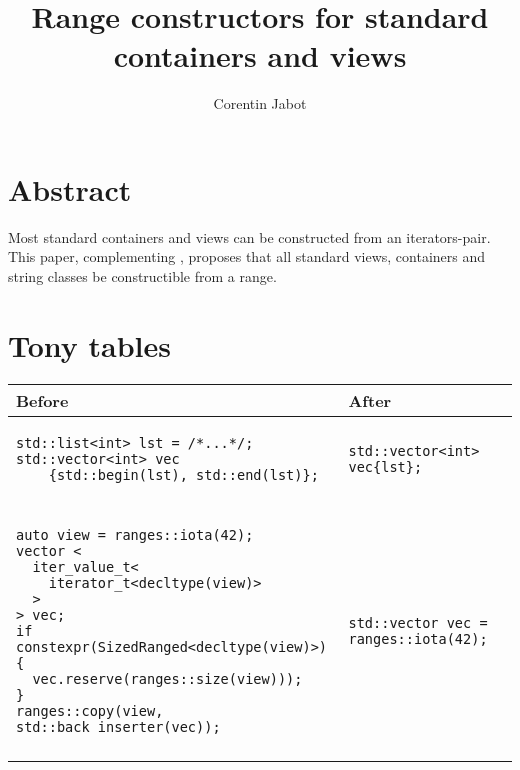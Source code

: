 \documentclass{wg21}
\title{Range constructors for standard containers and views}
\author{Corentin Jabot}{corentin.jabot@gmail.com}
\begin{document}
\maketitle

\section{Abstract}
Most standard containers and views can be constructed from an iterators-pair.
This paper, complementing \cite{P0896R3}, proposes that all standard views,
containers and string classes be constructible from a range.
\section{Tony tables}
\begin{center}
\begin{tabular}{l|l}
Before & After\\ \hline
\begin{minipage}[t]{0.5\textwidth}
\begin{verbatim}
std::list<int> lst = /*...*/;
std::vector<int> vec
	{std::begin(lst), std::end(lst)};
\end{verbatim}
\end{minipage}
&
\begin{minipage}[t]{0.5\textwidth}
\begin{verbatim}
std::vector<int> vec{lst};
\end{verbatim}
\end{minipage}
\\\\ \hline

\begin{minipage}[t]{0.5\textwidth}
\begin{verbatim}
auto view = ranges::iota(42);
vector <
  iter_value_t<
	iterator_t<decltype(view)>
  >
> vec;
if constexpr(SizedRanged<decltype(view)>) {
  vec.reserve(ranges::size(view)));
}
ranges::copy(view, std::back_inserter(vec));
\end{verbatim}
\end{minipage}
&
\begin{minipage}[t]{0.5\textwidth}
\begin{verbatim}
std::vector vec = ranges::iota(42);
\end{verbatim}
\end{minipage}
\\\\ \hline



\end{tabular}
\end{center}
\end{document}
